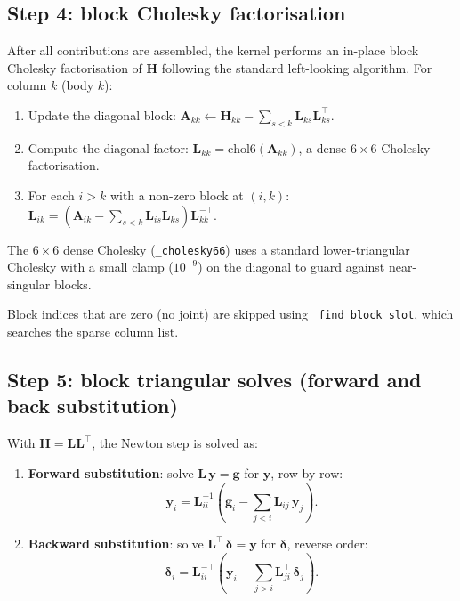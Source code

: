 \documentclass[11pt,a4paper]{article}
\begin{document}
\subsection{Step 4: block Cholesky factorisation}
\label{sec:cholesky}

After all contributions are assembled, the kernel performs an in-place
block Cholesky factorisation of $\mathbf{H}$ following the standard left-looking
algorithm.  For column $k$ (body $k$):

\begin{enumerate}[nosep]
  \item Update the diagonal block:
        $\mathbf{A}_{kk} \leftarrow \mathbf{H}_{kk}
          - \sum_{s<k} \mathbf{L}_{ks} \mathbf{L}_{ks}^\top$.
  \item Compute the diagonal factor:
        $\mathbf{L}_{kk} = \mathrm{chol6}(\mathbf{A}_{kk})$,
        a dense $6\times 6$ Cholesky factorisation.
  \item For each $i > k$ with a non-zero block at $(i,k)$:
        $\mathbf{L}_{ik} = (\mathbf{A}_{ik}
          - \sum_{s<k} \mathbf{L}_{is}\mathbf{L}_{ks}^\top)
          \mathbf{L}_{kk}^{-\top}$.
\end{enumerate}

The $6\times 6$ dense Cholesky (\texttt{\_cholesky66}) uses a standard
lower-triangular Cholesky with a small clamp ($10^{-9}$) on the diagonal to
guard against near-singular blocks.

Block indices that are zero (no joint) are skipped using
\texttt{\_find\_block\_slot}, which searches the sparse column list.

\subsection{Step 5: block triangular solves (forward and back substitution)}
\label{sec:solve}

With $\mathbf{H} = \mathbf{L}\mathbf{L}^\top$, the Newton step is solved as:

\begin{enumerate}[nosep]
  \item \textbf{Forward substitution}: solve $\mathbf{L}\,\mathbf{y} = \mathbf{g}$
        for $\mathbf{y}$, row by row:
        \[
          \mathbf{y}_i = \mathbf{L}_{ii}^{-1}
            \!\left(\mathbf{g}_i - \sum_{j<i} \mathbf{L}_{ij}\,\mathbf{y}_j\right).
        \]
  \item \textbf{Backward substitution}: solve $\mathbf{L}^\top\,\boldsymbol{\delta} = \mathbf{y}$
        for $\boldsymbol{\delta}$, reverse order:
        \[
          \boldsymbol{\delta}_i = \mathbf{L}_{ii}^{-\top}
            \!\left(\mathbf{y}_i - \sum_{j>i} \mathbf{L}_{ji}^\top\,\boldsymbol{\delta}_j\right).
        \]
\end{enumerate}
\end{document}
